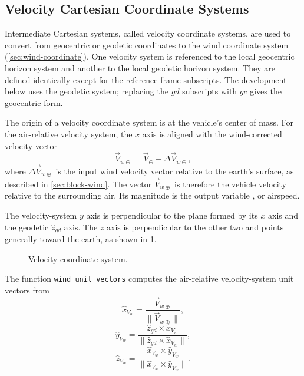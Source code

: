 \subsection{Velocity Cartesian Coordinate Systems}\label{sec:velocity-coordinate}

Intermediate Cartesian systems, called velocity coordinate systems, are used to
convert from geocentric or geodetic coordinates to the wind coordinate system
(\cref{sec:wind-coordinate}). One velocity system is referenced to the local
geocentric horizon system and another to the local geodetic horizon system. They
are defined identically except for the reference-frame subscripts. The development
below uses the geodetic system; replacing the $gd$ subscripts with $gc$ gives the
geocentric form.

The origin of a velocity coordinate system is at the vehicle's center of mass. For
the air-relative velocity system, the $x$ axis is aligned with the wind-corrected
velocity vector
\begin{equation}
  \vec V_{w\oplus}=\vec V_{\oplus}-\Delta\vec V_{w\oplus},
  \label{eq:wind-corrected-velocity}
\end{equation}
where $\Delta\vec V_{w\oplus}$ is the input wind velocity vector relative to the
earth's surface, as described in \cref{sec:block-wind}. The vector
$\vec V_{w\oplus}$ is therefore the vehicle velocity relative to the surrounding air.
Its magnitude is the output variable , or airspeed.

The velocity-system $y$ axis is perpendicular to the plane formed by its $x$ axis
and the geodetic $\hat z_{gd}$ axis. The $z$ axis is perpendicular to the other two
and points generally toward the earth, as shown in
\cref{fig:velocity-coordinate-system}.

\begin{figure}[htbp]
  \centering
  \resizebox{0.72\linewidth}{!}{}
  \caption{Velocity coordinate system.}
  \label{fig:velocity-coordinate-system}
\end{figure}

The function \texttt{wind\_unit\_vectors} computes the air-relative velocity-system
unit vectors from
\begin{equation}
  \hat x_{V_w}=\frac{\vec V_{w\oplus}}
  {\lVert\vec V_{w\oplus}\rVert},
  \label{eq:air-relative-velocity-x-axis}
\end{equation}
\begin{equation}
  \hat y_{V_w}
  =\frac{\hat z_{gd}\times\hat x_{V_w}}
  {\lVert\hat z_{gd}\times\hat x_{V_w}\rVert},
  \label{eq:air-relative-velocity-y-axis}
\end{equation}
\begin{equation}
  \hat z_{V_w}
  =\frac{\hat x_{V_w}\times\hat y_{V_w}}
  {\lVert\hat x_{V_w}\times\hat y_{V_w}\rVert}.
  \label{eq:air-relative-velocity-z-axis}
\end{equation}

